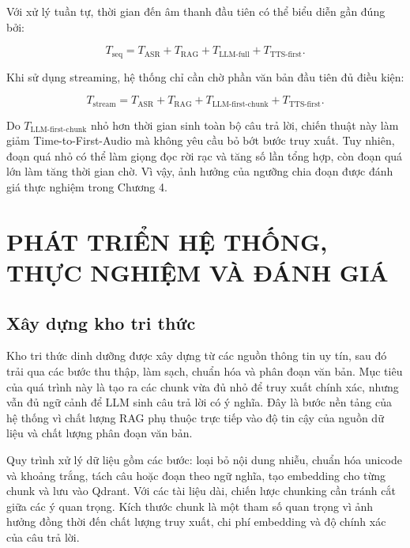 \documentclass[a4paper,13pt,oneside]{report}
\begin{document}
Với xử lý tuần tự, thời gian đến âm thanh đầu tiên có thể biểu diễn gần đúng bởi:

\begin{equation}
    T_{\mathrm{seq}}
    =
    T_{\mathrm{ASR}}
    +T_{\mathrm{RAG}}
    +T_{\mathrm{LLM\text{-}full}}
    +T_{\mathrm{TTS\text{-}first}}.
\end{equation}

Khi sử dụng streaming, hệ thống chỉ cần chờ phần văn bản đầu tiên đủ điều kiện:

\begin{equation}
    T_{\mathrm{stream}}
    =
    T_{\mathrm{ASR}}
    +T_{\mathrm{RAG}}
    +T_{\mathrm{LLM\text{-}first\text{-}chunk}}
    +T_{\mathrm{TTS\text{-}first}}.
\end{equation}

Do \(T_{\mathrm{LLM\text{-}first\text{-}chunk}}\) nhỏ hơn thời gian sinh toàn bộ câu trả lời, chiến thuật này làm giảm Time-to-First-Audio mà không yêu cầu bỏ bớt bước truy xuất. Tuy nhiên, đoạn quá nhỏ có thể làm giọng đọc rời rạc và tăng số lần tổng hợp, còn đoạn quá lớn làm tăng thời gian chờ. Vì vậy, ảnh hưởng của ngưỡng chia đoạn được đánh giá thực nghiệm trong Chương 4.

\chapter{PHÁT TRIỂN HỆ THỐNG, THỰC NGHIỆM VÀ ĐÁNH GIÁ}

\section{Xây dựng kho tri thức}

Kho tri thức dinh dưỡng được xây dựng từ các nguồn thông tin uy tín, sau đó trải qua các bước thu thập, làm sạch, chuẩn hóa và phân đoạn văn bản. Mục tiêu của quá trình này là tạo ra các chunk vừa đủ nhỏ để truy xuất chính xác, nhưng vẫn đủ ngữ cảnh để LLM sinh câu trả lời có ý nghĩa. Đây là bước nền tảng của hệ thống vì chất lượng RAG phụ thuộc trực tiếp vào độ tin cậy của nguồn dữ liệu và chất lượng phân đoạn văn bản.

Quy trình xử lý dữ liệu gồm các bước: loại bỏ nội dung nhiễu, chuẩn hóa unicode và khoảng trắng, tách câu hoặc đoạn theo ngữ nghĩa, tạo embedding cho từng chunk và lưu vào Qdrant. Với các tài liệu dài, chiến lược chunking cần tránh cắt giữa các ý quan trọng. Kích thước chunk là một tham số quan trọng vì ảnh hưởng đồng thời đến chất lượng truy xuất, chi phí embedding và độ chính xác của câu trả lời.
\end{document}
